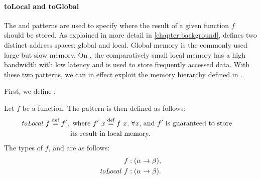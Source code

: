 


\paragraph{{\footnotesize to}Local and {\footnotesize to}Global}
The \toLocal and \toGlobal patterns are used to specify where the result of a given function $f$ should be stored.
As explained in more detail in \autoref{chapter:background}, \OpenCL defines two distinct address spaces: global and local.
Global memory is the commonly used large but slow memory.
On \GPUs, the comparatively small local memory has a high bandwidth with low latency and is used to store frequently accessed data.
With these two patterns, we can in effect exploit the memory hierarchy defined in \OpenCL.

First, we define \toLocal:
\begin{definition}
  \label{definition:pattern:toLocal}
  Let $f$ be a function.
  The \toLocal pattern is then defined as follows:
  \begin{align*}
    \text{\textit{toLocal}}\ f &\stackrel{\textrm{\scriptsize def}}{=} f',
    \begin{aligned}[t]
      &\text{ where $f'\ x \stackrel{\textrm{\scriptsize def}}{=} f\ x$, $\forall x$, and  $f'$ is guaranteed to store}\\
      &\text{its result in local memory.}
    \end{aligned}
  \end{align*}
  The types of $f$, and \toLocal are as follows:
  \begin{align*}
    f &: (\alpha \rightarrow \beta),\\
    \text{\textit{toLocal}}\ f &: (\alpha \rightarrow \beta) .
  \end{align*}
\end{definition}


